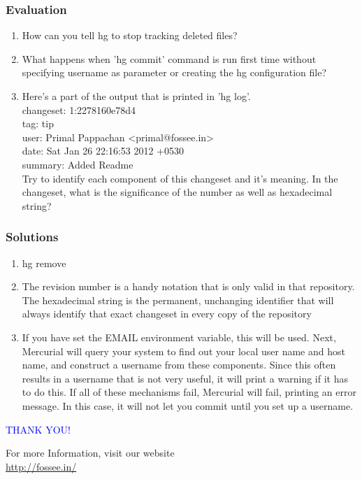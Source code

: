 \documentclass[14pt,compress]{beamer}
\begin{document}
\begin{frame}[fragile]
\frametitle{Evaluation}
\begin{enumerate}
\item \small{How can you tell hg to stop tracking deleted files?}
\item \small{What happens when 'hg commit' command is run first time without specifying username as parameter or creating the hg configuration file?}
\item \small{ Here's a part of the output that is printed in 'hg log'.\\}
\tiny{
	changeset:   1:2278160e78d4 \\
	tag:         tip \\
	user:        Primal Pappachan <primal@fossee.in> \\
	date:        Sat Jan 26 22:16:53 2012 +0530 \\
	summary:     Added Readme \\}
\small{Try to identify each component of this changeset and it's meaning. In the changeset, what is the significance of the number as well as hexadecimal string?} 
\end{enumerate}
\end{frame}

\begin{frame}
\frametitle{Solutions}
\begin{enumerate}
\item \small{hg remove}
\item \small{The revision number is a handy notation that is only valid in that repository. The hexadecimal string is the permanent, unchanging identifier that will always identify that exact changeset in every copy of the repository} 	
\item \small{If you have set the EMAIL environment variable, this will be used. Next, Mercurial will query your system to find out your local user name and host name, and construct a username from these components. Since this often results in a username that is not very useful, it will print a warning if it has to do this. If all of these mechanisms fail, Mercurial will fail, printing an error message. In this case, it will not let you commit until you set up a username.}	
\end{enumerate}
\end{frame}
\begin{frame}

\begin{block}{}
  \begin{center}
  \textcolor{blue}{\Large THANK YOU!} 
  \end{center}
  \end{block}
\begin{block}{}
  \begin{center}
    For more Information, visit our website\\
    \url{http://fossee.in/}
  \end{center}  
  \end{block}
\end{frame}
\end{document}
